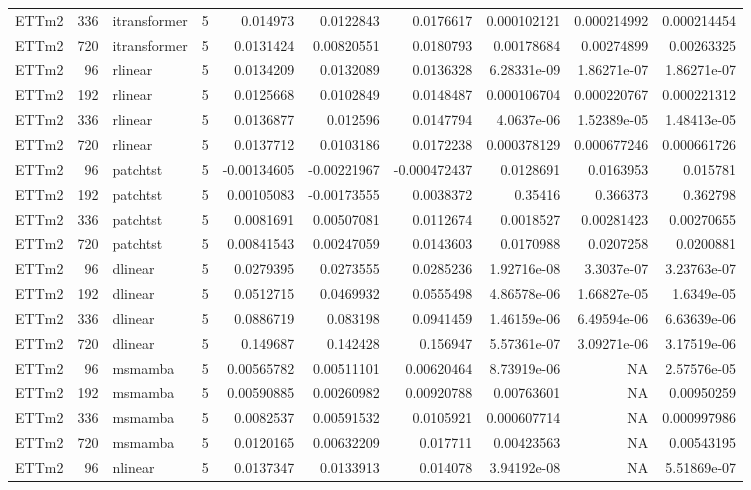\begin{longtable}{lrllrrrrrr}
ETTm2 & 336 & itransformer & 5 & 0.014973 & 0.0122843 & 0.0176617 & 0.000102121 & 0.000214992 & 0.000214454 \\
ETTm2 & 720 & itransformer & 5 & 0.0131424 & 0.00820551 & 0.0180793 & 0.00178684 & 0.00274899 & 0.00263325 \\
ETTm2 & 96 & rlinear & 5 & 0.0134209 & 0.0132089 & 0.0136328 & 6.28331e-09 & 1.86271e-07 & 1.86271e-07 \\
ETTm2 & 192 & rlinear & 5 & 0.0125668 & 0.0102849 & 0.0148487 & 0.000106704 & 0.000220767 & 0.000221312 \\
ETTm2 & 336 & rlinear & 5 & 0.0136877 & 0.012596 & 0.0147794 & 4.0637e-06 & 1.52389e-05 & 1.48413e-05 \\
ETTm2 & 720 & rlinear & 5 & 0.0137712 & 0.0103186 & 0.0172238 & 0.000378129 & 0.000677246 & 0.000661726 \\
ETTm2 & 96 & patchtst & 5 & -0.00134605 & -0.00221967 & -0.000472437 & 0.0128691 & 0.0163953 & 0.015781 \\
ETTm2 & 192 & patchtst & 5 & 0.00105083 & -0.00173555 & 0.0038372 & 0.35416 & 0.366373 & 0.362798 \\
ETTm2 & 336 & patchtst & 5 & 0.0081691 & 0.00507081 & 0.0112674 & 0.0018527 & 0.00281423 & 0.00270655 \\
ETTm2 & 720 & patchtst & 5 & 0.00841543 & 0.00247059 & 0.0143603 & 0.0170988 & 0.0207258 & 0.0200881 \\
ETTm2 & 96 & dlinear & 5 & 0.0279395 & 0.0273555 & 0.0285236 & 1.92716e-08 & 3.3037e-07 & 3.23763e-07 \\
ETTm2 & 192 & dlinear & 5 & 0.0512715 & 0.0469932 & 0.0555498 & 4.86578e-06 & 1.66827e-05 & 1.6349e-05 \\
ETTm2 & 336 & dlinear & 5 & 0.0886719 & 0.083198 & 0.0941459 & 1.46159e-06 & 6.49594e-06 & 6.63639e-06 \\
ETTm2 & 720 & dlinear & 5 & 0.149687 & 0.142428 & 0.156947 & 5.57361e-07 & 3.09271e-06 & 3.17519e-06 \\
ETTm2 & 96 & msmamba & 5 & 0.00565782 & 0.00511101 & 0.00620464 & 8.73919e-06 & NA & 2.57576e-05 \\
ETTm2 & 192 & msmamba & 5 & 0.00590885 & 0.00260982 & 0.00920788 & 0.00763601 & NA & 0.00950259 \\
ETTm2 & 336 & msmamba & 5 & 0.0082537 & 0.00591532 & 0.0105921 & 0.000607714 & NA & 0.000997986 \\
ETTm2 & 720 & msmamba & 5 & 0.0120165 & 0.00632209 & 0.017711 & 0.00423563 & NA & 0.00543195 \\
ETTm2 & 96 & nlinear & 5 & 0.0137347 & 0.0133913 & 0.014078 & 3.94192e-08 & NA & 5.51869e-07 \\

\end{longtable}
